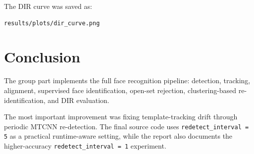 \documentclass[11pt,a4paper]{article}
\begin{document}
The DIR curve was saved as:

\begin{lstlisting}
results/plots/dir_curve.png
\end{lstlisting}

\section{Conclusion}

The group part implements the full face recognition pipeline: detection, tracking, alignment, supervised face identification, open-set rejection, clustering-based re-identification, and DIR evaluation.

The most important improvement was fixing template-tracking drift through periodic MTCNN re-detection. The final source code uses \texttt{redetect\_interval = 5} as a practical runtime-aware setting, while the report also documents the higher-accuracy \texttt{redetect\_interval = 1} experiment.
\end{document}
